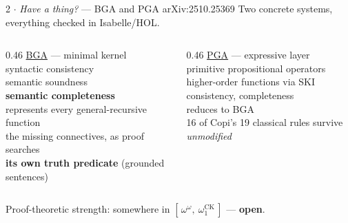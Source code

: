 \documentclass[aspectratio=169,11pt]{beamer}
\newcommand{\key}[1]{{\color{accent}\textbf{#1}}}
\newcommand{\amber}[1]{{\color{gap}\textbf{#1}}}
\begin{document}
\begin{frame}{2 $\cdot$ \emph{Have a thing?} \; --- BGA and PGA}
  {\small arXiv:2510.25369}
  \vfill
  Two concrete systems, everything checked in Isabelle/HOL.
  \vfill
  \begin{columns}[T]
    \begin{column}{0.46\textwidth}
      \underline{BGA} --- minimal kernel\\[0.6em]
      \small
      syntactic consistency\\
      semantic soundness\\
      \key{semantic completeness}\\
      represents every general-recursive function\\
      the missing connectives, as proof searches\\
      \key{its own truth predicate} (grounded sentences)
    \end{column}
    \begin{column}{0.46\textwidth}
      \underline{PGA} --- expressive layer\\[0.6em]
      \small
      primitive propositional operators\\
      higher-order functions via SKI\\
      consistency, completeness\\
      reduces to BGA\\[0.8em]
      16 of Copi's 19 classical rules survive \emph{unmodified}
    \end{column}
  \end{columns}
  \vfill
  \begin{center}\small
    Proof-theoretic strength: somewhere in
    $[\,\omega^{\omega},\ \omega_1^{\mathrm{CK}}\,]$ --- \amber{open}.
  \end{center}
\end{frame}
\end{document}
